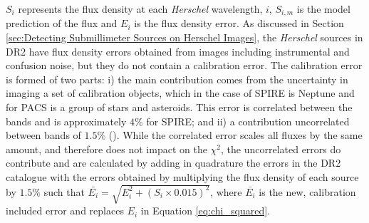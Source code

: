 $S_i$ represents the flux density at each \textit{Herschel} wavelength, $i$, $S_{i,m}$ is the model prediction of the flux and $E_i$ is the flux density error. As discussed in Section \ref{sec:Detecting Submillimeter Sources on Herschel Images}, the \textit{Herschel} sources in DR2 have flux density errors obtained from images including instrumental and confusion noise, but they do not contain a calibration error. The calibration error is formed of two parts: i) the main contribution comes from the uncertainty in imaging a set of calibration objects, which in the case of SPIRE is Neptune and for PACS is a group of stars and asteroids. This error is correlated between the bands and is approximately $4\%$ for SPIRE; and ii) a contribution uncorrelated between bands of $1.5\%$ (\citealt{Valiante_2016}). While the correlated error scales all fluxes by the same amount, and therefore does not impact on the $\chi^2$, the uncorrelated errors do contribute and are calculated by adding in quadrature the errors in the DR2 catalogue with the errors obtained by multiplying the flux density of each source by $1.5\%$ such that $\bar{E_i} = \sqrt{E_i^2 + (S_i \times 0.015)^2}$, where $\bar{E_i}$ is the new, calibration included error and replaces $E_i$ in Equation \ref{eq:chi_squared}.

